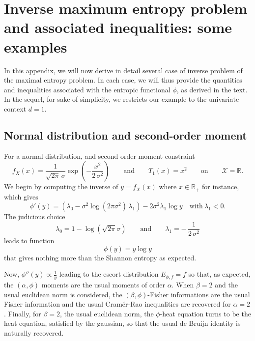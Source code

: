 \documentclass[english,sort&compress]{elsarticle}
\theoremstyle{definition}
\theoremstyle{plain}
\theoremstyle{plain}
\def\Rset{\mathbb{R}}
\def\X{\mathcal{X}}
\begin{document}

\appendix

\section{Inverse  maximum  entropy  problem  and associated  inequalities:  some
  examples}

In this appendix, we  will now derive in detail several  case of inverse problem
of  the  maximal  entropy problem.  In  each  case,  we  will thus  provide  the
quantities and inequalities  associated with the entropic  functional $\phi$, as
derived in  the text. In  the sequel, for sake  of simplicity, we  restricts our
example to the univariate context $d = 1$.



\subsection{Normal distribution and second-order moment}
\label{subsec:NormalSecondOrder}

For a normal distribution, and second order moment constraint 
%
\[
f_X(x)  = \frac{1}{\sqrt{2\pi} \,\sigma}  \exp\left( -\frac{x^2}{2  \, \sigma^2}
\right)  \qquad \mbox{and}  \qquad T_1(x)  = x^2  \qquad \mbox{on}  \qquad  \X =
\Rset.
\]
%
We begin  by computing the  inverse of  $y = f_X(x)$  where $x \in  \Rset_+$ for
instance, which gives
%
\[
\phi'(y) = \left( \lambda_0 - \sigma^2 \log(2 \pi \sigma^2) \, \lambda_1 \right)
- 2 \sigma^2 \lambda_1 \log y \quad \mbox{with} \: \lambda_1 < 0.
\]
%
The judicious choice
%
\[
\lambda_0 = 1 - \log( \sqrt{2\pi}  \sigma ) \qquad \mbox{and} \qquad \lambda_1 =
- \, \frac{1}{2 \, \sigma^2}
\]
%
leads to function
%
\[
\phi(y) = y \log y
\]
%
that gives nothing more than the Shannon entropy as expected.

Now, $\phi''(y) \propto \frac1y$ leading  to the escort distribution $E_{\phi,f}
= f$ so that, as expected, the  $(\alpha,\phi)$ moments are the usual moments of
order $\alpha$. When $\beta = 2$ and the usual euclidean norm is considered, the
$(\beta,\phi)$-Fisher  informations are  the  usual Fisher  information and  the
usual Cram\'er-Rao  inequalities are recovered  for $\alpha = 2$.   Finally, for
$\beta = 2$, the usual euclidean norm,  the $\phi$-heat equation turns to be the
heat equation, satisfied  by the gaussian, so that the  usual de Bruijn identity
is naturally recovered.
\end{document}
